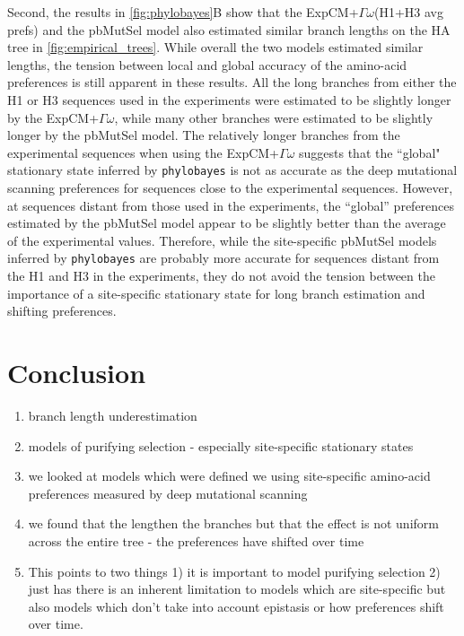 \documentclass[11pt]{article}
\begin{document}
Second, the results in \ref{fig:phylobayes}B show that the ExpCM+$\Gamma\omega$(H1+H3 avg prefs) and the pbMutSel model also estimated similar branch lengths on the HA tree in \ref{fig:empirical_trees}. 
While overall the two models estimated similar lengths, the tension between local and global accuracy of the amino-acid preferences is still apparent in these results. 
All the long branches from either the H1 or H3 sequences used in the experiments were estimated to be slightly longer by the ExpCM+$\Gamma\omega$, while many other branches were estimated to be slightly longer by the pbMutSel model. 
The relatively longer branches from the experimental sequences when using the ExpCM+$\Gamma\omega$ suggests that the ``global" stationary state inferred by \texttt{phylobayes} is not as accurate as the deep mutational scanning preferences for sequences close to the experimental sequences. 
However, at sequences distant from those used in the experiments, the ``global'' preferences estimated by the pbMutSel model appear to be slightly better than the average of the experimental values.
Therefore, while the site-specific pbMutSel models inferred by \texttt{phylobayes} are probably more accurate for sequences distant from the H1 and H3 in the experiments, they do not avoid the tension between the importance of a site-specific stationary state for long branch estimation and shifting preferences. 

\section*{Conclusion}

\begin{enumerate}
	\item branch length underestimation
	\item models of purifying selection - especially site-specific stationary states 
	\item we looked at models which were defined we using site-specific amino-acid preferences measured by deep mutational scanning 
	\item we found that the lengthen the branches but that the effect is not uniform across the entire tree - the preferences have shifted over time 
	\item This points to two things 1) it is important to model purifying selection 2) just has there is an inherent limitation to models which are site-specific but also models which don't take into account epistasis or how preferences shift over time. 
\end{enumerate}
\end{document}
